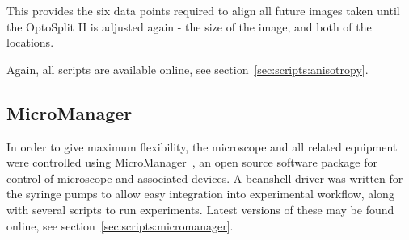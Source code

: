 \documentclass[../main.tex]{subfiles}
\begin{document}
This provides the six data points required to align all future images taken until the OptoSplit II is adjusted again - the size of the image, and both of the locations.

Again, all scripts are available online, see section~\ref{sec:scripts:anisotropy}.

\subsection{MicroManager}

In order to give maximum flexibility, the microscope and all related equipment were controlled using MicroManager~\citep{micromanager}, an open source software package for control of microscope and associated devices. A beanshell driver was written for the syringe pumps to allow easy integration into experimental workflow, along with several scripts to run experiments. Latest versions of these may be found online, see section~\ref{sec:scripts:micromanager}.
\end{document}
